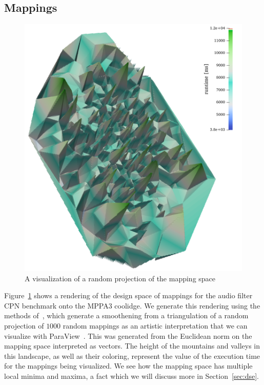 \subsection{Mappings}
\begin{figure}[h]
	\centering
\includegraphics[width=\textwidth]{figures/coolidge-af-space3.png}
	\caption{A visualization of a random projection of the mapping space}
	\label{fig:mapping_space_visualization}
\end{figure}

Figure~\ref{fig:mapping_space_visualization} shows a rendering of the design space of mappings for the audio filter \ac{CPN} benchmark onto the MPPA3 coolidge. 
We generate this rendering using the methods of~\cite{visualloss}, which generate a smoothening from a triangulation of a random projection of $1000$ random mappings as an artistic interpretation that we can visualize with ParaView~\cite{paraview}.
This was generated from the Euclidean norm on the mapping space interpreted as vectors.
The height of the mountains and valleys in this landscape, as well as their coloring, represent the value of the execution time for the mappings being visualized.
We see how the mapping space has multiple local minima and maxima, a fact which we will discuss more in Section~\ref{sec:dse}. 

